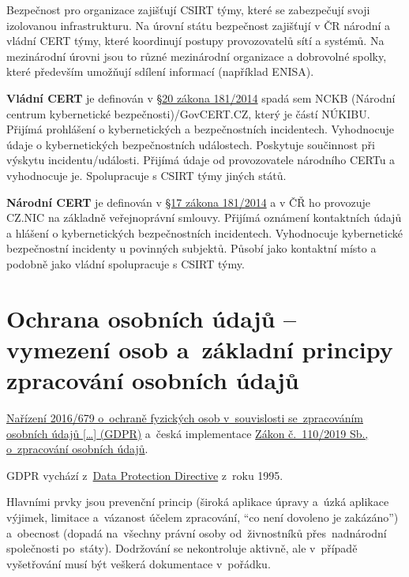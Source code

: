 Bezpečnost pro organizace zajišťují CSIRT týmy, které se zabezpečují svoji izolovanou infrastrukturu. Na úrovní státu bezpečnost zajišťují v ČR národní a vládní CERT týmy, které koordinují postupy provozovatelů sítí a systémů. Na mezinárodní úrovni jsou to různé mezinárodní organizace a dobrovolné spolky, které především umožňují sdílení informací (například ENISA).

\textbf{Vládní CERT} je definován v \href{https://www.zakonyprolidi.cz/cs/2014-181#p20}{§20 zákona 181/2014} spadá sem NCKB (Národní centrum kybernetické bezpečnosti)/GovCERT.CZ, který je částí NÚKIBU. Přijímá prohlášení o kybernetických a bezpečnostních incidentech. Vyhodnocuje údaje o kybernetických bezpečnostních událostech. Poskytuje součinnost při výskytu incidentu/události. Přijímá údaje od provozovatele národního CERTu a vyhodnocuje je. Spolupracuje s CSIRT týmy jiných států.

\textbf{Národní CERT} je definován v \href{https://www.zakonyprolidi.cz/cs/2014-181#p17}{§17 zákona 181/2014} a v ČŘ ho provozuje CZ.NIC na základně veřejnoprávní smlouvy. Přijímá oznámení kontaktních údajů a hlášení o kybernetických bezpečnostních incidentech. Vyhodnocuje kybernetické bezpečnostní incidenty u povinných subjektů. Působí jako kontaktní místo a podobně jako vládní spolupracuje s CSIRT týmy.







\clearpage
\section{Ochrana osobních údajů -- vymezení osob a~základní principy zpracování osobních údajů}

\href{https://eur-lex.europa.eu/legal-content/CS/TXT/HTML/?uri=CELEX:32016R0679}{Nařízení 2016/679 o~ochraně fyzických osob v~souvislosti se~zpracováním osobních údajů [\dots] (GDPR)} a~česká implementace
\href{https://www.zakonyprolidi.cz/cs/2019-110}{Zákon č.~110/2019 Sb., o~zpracování osobních údajů}.

GDPR vychází z~\href{https://eur-lex.europa.eu/legal-content/cs/TXT/HTML/?uri=CELEX:31995L0046}{Data Protection Directive} z~roku 1995.

Hlavními prvky jsou prevenční princip (široká aplikace úpravy a~úzká aplikace výjimek, limitace a~vázanost účelem zpracování, \enquote{co není dovoleno je zakázáno}) a~obecnost (dopadá na~všechny právní osoby od~živnostníků přes~nadnárodní společnosti po~státy). Dodržování se nekontroluje aktivně, ale v~případě vyšetřování musí být veškerá dokumentace v~pořádku.

